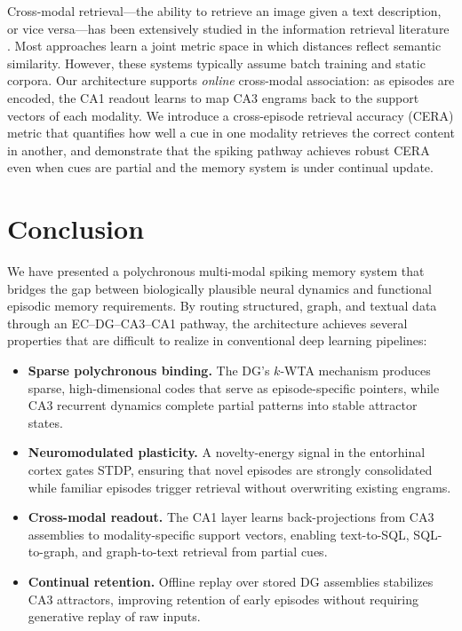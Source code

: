 Cross-modal retrieval---the ability to retrieve an image given a text description, or vice versa---has been extensively studied in the information retrieval literature \cite{wang2016comprehensive}. Most approaches learn a joint metric space in which distances reflect semantic similarity. However, these systems typically assume batch training and static corpora. Our architecture supports \textit{online} cross-modal association: as episodes are encoded, the CA1 readout learns to map CA3 engrams back to the support vectors of each modality. We introduce a cross-episode retrieval accuracy (CERA) metric that quantifies how well a cue in one modality retrieves the correct content in another, and demonstrate that the spiking pathway achieves robust CERA even when cues are partial and the memory system is under continual update.


\section{Conclusion}

We have presented a polychronous multi-modal spiking memory system that bridges the gap between biologically plausible neural dynamics and functional episodic memory requirements. By routing structured, graph, and textual data through an EC--DG--CA3--CA1 pathway, the architecture achieves several properties that are difficult to realize in conventional deep learning pipelines:

\begin{itemize}
    \item \textbf{Sparse polychronous binding.} The DG's $k$-WTA mechanism produces sparse, high-dimensional codes that serve as episode-specific pointers, while CA3 recurrent dynamics complete partial patterns into stable attractor states.
    \item \textbf{Neuromodulated plasticity.} A novelty-energy signal in the entorhinal cortex gates STDP, ensuring that novel episodes are strongly consolidated while familiar episodes trigger retrieval without overwriting existing engrams.
    \item \textbf{Cross-modal readout.} The CA1 layer learns back-projections from CA3 assemblies to modality-specific support vectors, enabling text-to-SQL, SQL-to-graph, and graph-to-text retrieval from partial cues.
    \item \textbf{Continual retention.} Offline replay over stored DG assemblies stabilizes CA3 attractors, improving retention of early episodes without requiring generative replay of raw inputs.
\end{itemize}

